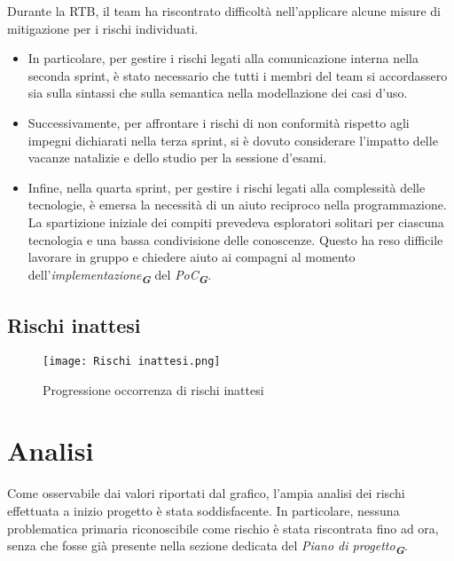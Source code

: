 Durante la RTB, il team ha riscontrato difficoltà nell'applicare alcune misure di mitigazione
per i rischi individuati.\\
\begin{itemize}
    \item In particolare, per gestire i rischi legati alla comunicazione interna nella seconda sprint, è stato necessario che tutti i membri del team si accordassero sia sulla sintassi che sulla semantica nella modellazione dei casi d'uso.
    \item Successivamente, per affrontare i rischi di non conformità rispetto agli impegni dichiarati nella terza sprint, si è dovuto considerare l'impatto delle vacanze natalizie e dello studio per la sessione d'esami.
    \item Infine, nella quarta sprint, per gestire i rischi legati alla complessità delle tecnologie, è emersa la necessità di un aiuto reciproco nella programmazione. La spartizione iniziale dei compiti prevedeva esploratori solitari per ciascuna tecnologia e una bassa condivisione delle conoscenze. Questo ha reso difficile lavorare in gruppo e chiedere aiuto ai compagni al momento dell'\emph{implementazione}\textsubscript{\textbf{\textit{G}}} del \emph{PoC}\textsubscript{\textbf{\textit{G}}}.

\end{itemize}

\newpage

\subsection{Rischi inattesi}
\label{subsec:Rischi inattesi}

\begin{figure}[h] 
    \centering
    \texttt{[image: Rischi inattesi.png]}
    \caption{Progressione occorrenza di rischi inattesi} 
    \label{fig: Rischi inattesi}
\end{figure}

\section*{Analisi}

Come osservabile dai valori riportati dal grafico, l’ampia analisi dei rischi effettuata a
inizio progetto è stata soddisfacente. In particolare, nessuna problematica primaria
riconoscibile come rischio è stata riscontrata fino ad ora, senza che fosse già presente
nella sezione dedicata del \emph{Piano di progetto}\textsubscript{\textbf{\textit{G}}}.


